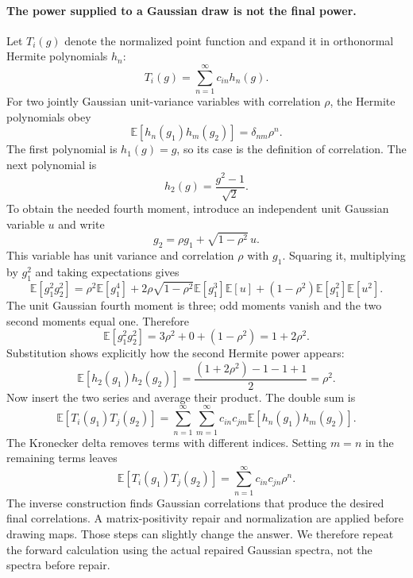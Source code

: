 \documentclass[11pt]{article}
\newcommand{\E}{\mathbb E}
\begin{document}
\paragraph{The power supplied to a Gaussian draw is not the final power.}
Let $T_i(g)$ denote the normalized point function and expand it in
orthonormal Hermite polynomials $h_n$:
\begin{equation}
 T_i(g)=\sum_{n=1}^{\infty}c_{in}h_n(g).
\end{equation}
For two jointly Gaussian unit-variance variables with correlation $\rho$,
the Hermite polynomials obey
\begin{equation}
 \E[h_n(g_1)h_m(g_2)]=\delta_{nm}\rho^n.
\end{equation}
The first polynomial is $h_1(g)=g$, so its case is the definition of
correlation. The next polynomial is
\begin{equation}
 h_2(g)=\frac{g^2-1}{\sqrt{2}}.
\end{equation}
To obtain the needed fourth moment, introduce an independent unit Gaussian
variable $u$ and write
\begin{equation}
 g_2=\rho g_1+\sqrt{1-\rho^2}\,u.
\end{equation}
This variable has unit variance and correlation $\rho$ with $g_1$.
Squaring it, multiplying by $g_1^2$ and taking expectations gives
\begin{equation}
 \E[g_1^2g_2^2]=\rho^2\E[g_1^4]
 +2\rho\sqrt{1-\rho^2}\E[g_1^3]\E[u]
 +(1-\rho^2)\E[g_1^2]\E[u^2].
\end{equation}
The unit Gaussian fourth moment is three; odd moments vanish and the two
second moments equal one. Therefore
\begin{equation}
 \E[g_1^2g_2^2]=3\rho^2+0+(1-\rho^2)=1+2\rho^2.
\end{equation}
Substitution shows explicitly how the second Hermite power appears:
\begin{equation}
 \E[h_2(g_1)h_2(g_2)]
 =\frac{(1+2\rho^2)-1-1+1}{2}=\rho^2.
\end{equation}
Now insert the two series and average their product. The double sum is
\begin{equation}
 \E[T_i(g_1)T_j(g_2)]
 =\sum_{n=1}^{\infty}\sum_{m=1}^{\infty}
 c_{in}c_{jm}\E[h_n(g_1)h_m(g_2)].
\end{equation}
The Kronecker delta removes terms with different indices. Setting $m=n$
in the remaining terms leaves
\begin{equation}
 \E[T_i(g_1)T_j(g_2)]=\sum_{n=1}^{\infty}c_{in}c_{jn}\rho^n.
\end{equation}
The inverse construction finds Gaussian correlations that produce the
desired final correlations. A matrix-positivity repair and normalization
are applied before drawing maps. Those steps can slightly change the
answer. We therefore repeat the forward calculation using the actual
repaired Gaussian spectra, not the spectra before repair.
\end{document}
